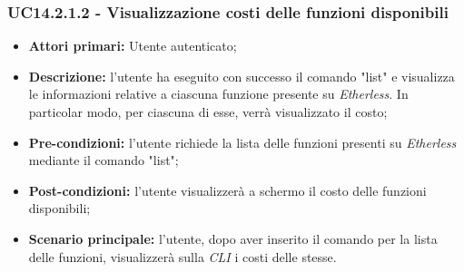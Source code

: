\subsubsection{UC14.2.1.2 - Visualizzazione costi delle funzioni disponibili}
\begin{itemize}
	\item \textbf{Attori primari:} Utente autenticato;
	\item \textbf{Descrizione:} l'utente ha eseguito con successo il comando "list" e visualizza le informazioni relative a ciascuna funzione presente su \textit{Etherless}. In particolar modo, per ciascuna di esse, verrà visualizzato il costo;
	\item \textbf{Pre-condizioni:} l'utente richiede la lista delle funzioni presenti su \textit{Etherless} mediante il comando "list";
	\item \textbf{Post-condizioni:} l'utente visualizzerà a schermo il costo delle funzioni disponibili;
	\item \textbf{Scenario principale:} l'utente, dopo aver inserito il comando per la lista delle funzioni, visualizzerà sulla \textit{CLI\glo} i costi delle stesse.
\end{itemize}
